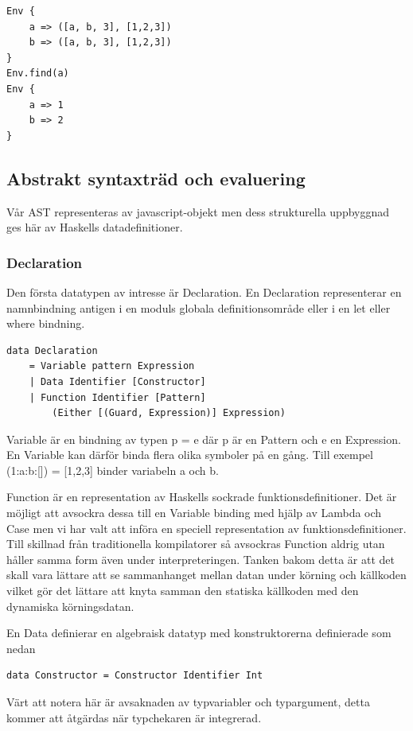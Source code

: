 \begin{lstlisting}
Env {
    a => ([a, b, 3], [1,2,3])
    b => ([a, b, 3], [1,2,3])
}
Env.find(a)
Env {
    a => 1
    b => 2
}
\end{lstlisting}

\subsection{Abstrakt syntaxträd och evaluering} 
Vår AST representeras av javascript-objekt men dess strukturella uppbyggnad ges här av Haskells datadefinitioner.

\subsubsection{Declaration}
Den första datatypen av intresse är Declaration. En Declaration representerar en namnbindning antigen i en moduls globala definitionsområde eller i en let eller where bindning.

\begin{lstlisting}
data Declaration 
    = Variable pattern Expression
    | Data Identifier [Constructor]
    | Function Identifier [Pattern] 
        (Either [(Guard, Expression)] Expression)
\end{lstlisting}

Variable är en bindning av typen p = e där p är en Pattern och e en Expression. En Variable kan därför binda flera olika symboler på en gång. Till exempel (1:a:b:[]) = [1,2,3] binder variabeln a och b.

Function är en representation av Haskells sockrade funktionsdefinitioner. Det är möjligt att avsockra dessa till en Variable binding med hjälp av Lambda och Case men vi har valt att införa en speciell representation av funktionsdefinitioner. Till skillnad från traditionella kompilatorer så avsockras Function aldrig utan håller samma form även under interpreteringen. Tanken bakom detta är att det skall vara lättare att se sammanhanget mellan datan under körning och källkoden vilket gör det lättare att knyta samman den statiska källkoden med den dynamiska körningsdatan.

En Data definierar en algebraisk datatyp med konstruktorerna definierade som nedan
\begin{lstlisting}
data Constructor = Constructor Identifier Int
\end{lstlisting}
Värt att notera här är avsaknaden av typvariabler och typargument, detta kommer att åtgärdas när typchekaren är integrerad.

